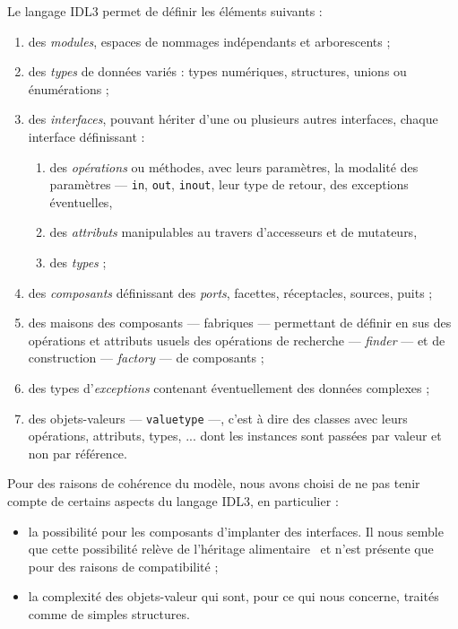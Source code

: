 Le langage \textsf{IDL3} permet de d\'efinir les \'el\'ements suivants :
\begin{enumerate}
  \item des \emph{modules}, espaces de nommages ind\'ependants et arborescents
  ;
\item  des \emph{types} de donn\'ees vari\'es : types num\'eriques,
  structures, unions ou \'enum\'erations ;
\item des \emph{interfaces}, pouvant h\'eriter d'une ou plusieurs autres
  interfaces, chaque   interface d\'efinissant :
  \begin{enumerate}
    \item des \emph{op\'erations} ou m\'ethodes, avec leurs
    param\`etres, la modalit\'e des param\`etres --- \texttt{in}, \texttt{out}, \texttt{inout},
    leur type de retour, des exceptions \'eventuelles,
  \item des \emph{attributs} manipulables au travers d'accesseurs et
  de mutateurs,
\item des \emph{types} ;
  \end{enumerate}
\item des \emph{composants} d\'efinissant  des \emph{ports},
  facettes, r\'eceptacles, sources, puits ;
\item des maisons des composants --- fabriques ---  permettant de
  d\'efinir en sus des op\'erations et attributs usuels des op\'erations de
  recherche --- \emph{finder} --- et de construction ---
  \emph{factory} --- de composants ;
\item des types d'\emph{exceptions} contenant \'eventuellement des
  donn\'ees complexes ;
\item des objets-valeurs --- \texttt{valuetype} ---, c'est \`a dire des classes
  avec leurs op\'erations, attributs, types, ... dont les instances sont
  pass\'ees par valeur et non par r\'ef\'erence.
\end{enumerate}

Pour des raisons de coh\'erence du mod\`ele,
nous avons choisi de ne pas tenir compte de certains aspects du
langage \textsf{IDL3}, en particulier :
\begin{itemize}
  \item la possibilit\'e pour les composants d'implanter des
  interfaces. Il nous semble que
  cette possibilit\'e rel\`eve de \og l'h\'eritage alimentaire\fg~
  et n'est pr\'esente que pour des raisons de compatibilit\'e ;
\item la complexit\'e des objets-valeur qui sont, pour ce qui nous
  concerne, trait\'es comme de simples structures.
\end{itemize}

